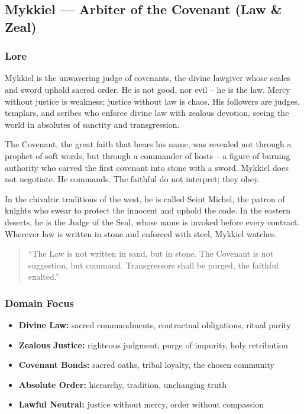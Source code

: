 
\subsection{Mykkiel --- Arbiter of the Covenant (Law \& Zeal)}

\subsubsection*{Lore}
Mykkiel is the unwavering judge of covenants, the divine lawgiver whose scales and sword uphold sacred order. He is not good, nor evil -- he is the law. Mercy without justice is weakness; justice without law is chaos. His followers are judges, templars, and scribes who enforce divine law with zealous devotion, seeing the world in absolutes of sanctity and transgression.

The Covenant, the great faith that bears his name, was revealed not through a prophet of soft words, but through a commander of hosts -- a figure of burning authority who carved the first covenant into stone with a sword. Mykkiel does not negotiate. He commands. The faithful do not interpret; they obey.

In the chivalric traditions of the west, he is called Seint Michel, the patron of knights who swear to protect the innocent and uphold the code. In the eastern deserts, he is the Judge of the Seal, whose name is invoked before every contract. Wherever law is written in stone and enforced with steel, Mykkiel watches.

\begin{quote}
``The Law is not written in sand, but in stone. The Covenant is not suggestion, but command. Transgressors shall be purged, the faithful exalted.''
\end{quote}

\subsubsection*{Domain Focus}
\begin{itemize}
  \item \textbf{Divine Law:} sacred commandments, contractual obligations, ritual purity
  \item \textbf{Zealous Justice:} righteous judgment, purge of impurity, holy retribution
  \item \textbf{Covenant Bonds:} sacred oaths, tribal loyalty, the chosen community
  \item \textbf{Absolute Order:} hierarchy, tradition, unchanging truth
  \item \textbf{Lawful Neutral:} justice without mercy, order without compassion
\end{itemize}


